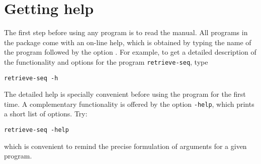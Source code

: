\chapter{Getting help} 

The first step before using any program is to read the manual. All
programs in the \RSAT package come with an on-line help, which is
obtained by typing the name of the program followed by the option
. For example, to get a detailed description of the
functionality and options for the program \texttt{retrieve-seq}, type

\begin{verbatim}
retrieve-seq -h
\end{verbatim}

The detailed help is specially convenient before using the program for
the first time. A complementary functionality is offered by the option
\texttt{-help}, which prints a short list of options. Try:

\begin{verbatim}
retrieve-seq -help
\end{verbatim}

which is convenient to remind the precise formulation of arguments for
a given program.



